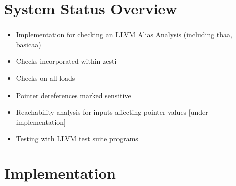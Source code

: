 \documentclass[mathserif,10pt]{beamer}
\begin{document}
\section{System Status Overview}
\frame
{
  \frametitle{\secname}
  \begin{itemize} [<+->]
    \item Implementation for checking an LLVM Alias Analysis (including tbaa, basicaa)
    \vspace{1cm}
    \item Checks incorporated within zesti
    \vspace{1cm}
    \item Checks on all loads
    \vspace{1cm}
    \item Pointer dereferences marked sensitive
    \vspace{1cm}
    \item Reachability analysis for inputs affecting pointer values [under implementation]
    \vspace{1cm}
    \item Testing with LLVM test suite programs
  \end{itemize} 
}

\section{Implementation}
\end{document}
